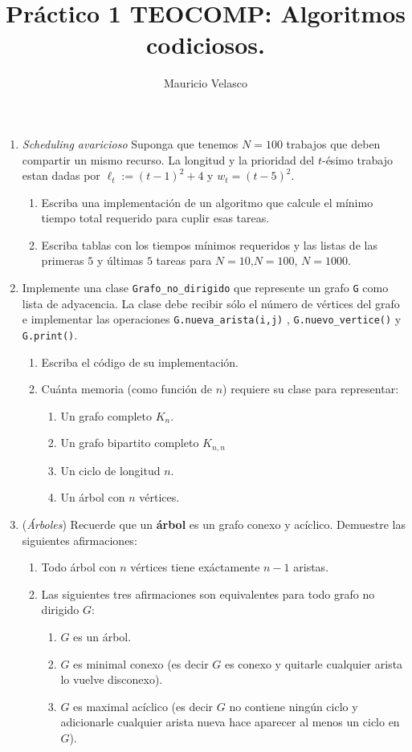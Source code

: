 \documentclass[12pt, a4paper]{article}
\date{}
\begin{document}
\title{Pr\'actico 1 TEOCOMP: Algoritmos codiciosos.}
\author{Mauricio Velasco}
\maketitle{}
\begin{enumerate} 

\item {\it Scheduling avaricioso} Suponga que tenemos $N=100$ trabajos que deben compartir un mismo recurso. La longitud y la prioridad del $t$-ésimo trabajo estan dadas por $\ell_t:=(t-1)^2+4$ y $w_t=(t-5)^2$.
\begin{enumerate}
\item Escriba una implementación de un algoritmo que calcule el mínimo tiempo total requerido para cuplir esas tareas.
\item Escriba tablas con los tiempos mínimos requeridos y las listas de las primeras $5$ y últimas $5$ tareas para $N=10$,$N=100$, $N=1000$.
\end{enumerate} 


\item Implemente una clase \verb!Grafo_no_dirigido! que represente un grafo \verb!G! como lista de adyacencia. La clase debe recibir sólo el número de vértices del grafo e implementar las operaciones \verb!G.nueva_arista(i,j)! , \verb!G.nuevo_vertice()! y \verb!G.print()!.
\begin{enumerate}
\item Escriba el c\'odigo de su implementaci\'on.
\item Cu\'anta memoria (como funci\'on de $n$) requiere su clase para representar:
\begin{enumerate}
\item Un grafo completo $K_n$.
\item Un grafo bipartito completo $K_{n,n}$
\item Un ciclo de longitud $n$.
\item Un \'arbol con $n$ v\'ertices.
\end{enumerate} 
\end{enumerate}

\item({\it Árboles}) Recuerde que un {\bf árbol} es un grafo conexo y acíclico. Demuestre las siguientes afirmaciones:

\begin{enumerate}
\item Todo árbol con $n$ vértices tiene exáctamente $n-1$ aristas.
\item Las siguientes tres afirmaciones son equivalentes para todo grafo no dirigido $G$:
\begin{enumerate}
\item $G$ es un árbol.
\item $G$ es minimal conexo (es decir $G$ es conexo y quitarle cualquier arista lo vuelve disconexo).
\item $G$ es maximal acíclico (es decir $G$ no contiene ningún ciclo y adicionarle cualquier arista nueva hace aparecer al menos un ciclo en $G$).
\end{enumerate}
\end{enumerate} 



\end{enumerate}
\end{document}
